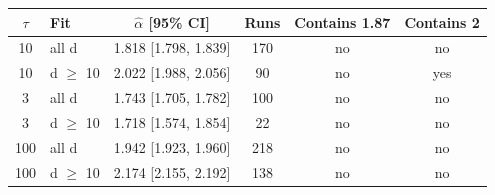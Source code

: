 \begin{tabular}{clcccc}
\toprule
$\tau$ & Fit & $\hat\alpha$ [95\% CI] & Runs & Contains 1.87 & Contains 2 \\
\midrule
10 & all d & 1.818 [1.798, 1.839] & 170 & no & no \\
10 & d $\geq$ 10 & 2.022 [1.988, 2.056] & 90 & no & yes \\
3 & all d & 1.743 [1.705, 1.782] & 100 & no & no \\
3 & d $\geq$ 10 & 1.718 [1.574, 1.854] & 22 & no & no \\
100 & all d & 1.942 [1.923, 1.960] & 218 & no & no \\
100 & d $\geq$ 10 & 2.174 [2.155, 2.192] & 138 & no & no \\
\bottomrule
\end{tabular}
